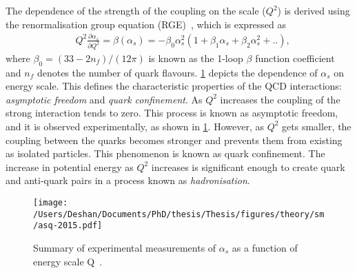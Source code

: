 The dependence of the strength of the coupling on the scale ($Q^2$) is derived using the renormalisation group equation (RGE)~\cite{PDG}, which is expressed as
\begin{equation}
    \label{eq:rge}
    \begin{aligned}
        & Q^2 \frac{\partial\alpha_s}{\partial Q^2} = \beta(\alpha_s) = -\beta_0\alpha_s^2(1+\beta_1\alpha_s + \beta_2\alpha_s^2+ ..),
     \end{aligned}
\end{equation}
where $\beta_0 = (33-2n_f)/(12\pi)$ is known as the 1-loop $\beta$ function coefficient and $n_f$ denotes the number of quark flavours. \cref{fig:alphasrun} depicts the dependence of $\alpha_s$ on energy scale. This defines the characteristic properties of the QCD interactions: \emph{asymptotic freedom} and \emph{quark confinement}. As $Q^2$ increases the coupling of the strong interaction tends to zero. This process is known as asymptotic freedom, and it is observed experimentally, as shown in \cref{fig:alphasrun}. However, as $Q^2$ gets smaller, the coupling between the quarks becomes stronger and prevents them from existing as isolated particles. This phenomenon is known as quark confinement. The increase in potential energy as $Q^2$ increases is significant enough to create quark and anti-quark pairs in a process known as \emph{hadronisation}.
\begin{figure}[!htpb]
    \centering
    \texttt{[image: /Users/Deshan/Documents/PhD/thesis/Thesis/figures/theory/sm/asq-2015.pdf]}
    \caption{Summary of experimental measurements of $\alpha_s$ as a function of energy scale Q~\cite{PDG}.}
    \label{fig:alphasrun}
\end{figure}
